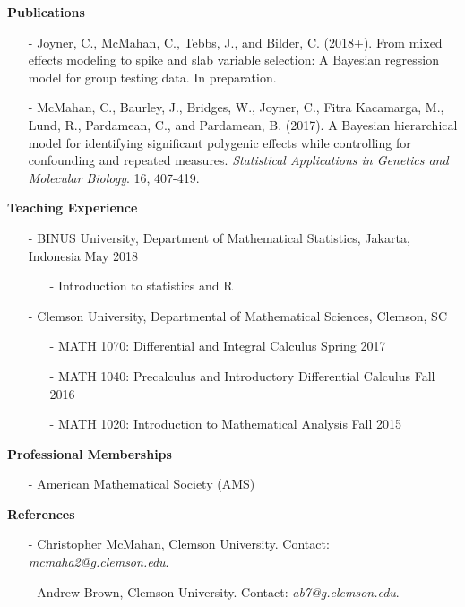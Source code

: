 \documentclass[10pt]{article}
\begin{document}
\newpage
\noindent
\textbf{Publications}
\begin{itemize}
\item[-] Joyner, C., McMahan, C., Tebbs, J., and Bilder, C. (2018+).  From mixed effects modeling to spike and slab variable selection: A Bayesian regression model for group testing data. In preparation.
\item[-] McMahan, C., Baurley, J., Bridges, W., Joyner, C., Fitra Kacamarga, M., Lund, R., Pardamean, C., and Pardamean, B. (2017). A Bayesian hierarchical model for identifying significant polygenic effects while controlling for confounding and repeated measures. \textit{Statistical Applications in Genetics and Molecular Biology}. 16, 407-419.
\end{itemize}

\noindent
\textbf{Teaching Experience}
\begin{itemize}
\item[-] BINUS University, Department of Mathematical Statistics, Jakarta, Indonesia \hfill May 2018
\begin{itemize}

\vspace{-0.25cm}

\item[-] Introduction to statistics and R
\end{itemize}
\item[-] Clemson University, Departmental of Mathematical Sciences, Clemson, SC
\begin{itemize}

\vspace{-0.25cm}

\item[-] MATH 1070: Differential and Integral Calculus \hfill Spring 2017

\vspace{-0.05cm}

\item[-] MATH 1040: Precalculus and Introductory Differential Calculus \hfill Fall 2016

\vspace{-0.05cm}

\item[-] MATH 1020: Introduction to Mathematical Analysis \hfill Fall 2015
\end{itemize}
\end{itemize}

\noindent
\textbf{Professional Memberships}
\begin{itemize}
\item[-] American Mathematical Society (AMS)
\end{itemize}

\noindent
\textbf{References}
\begin{itemize}
\item[-] Christopher McMahan, Clemson University. Contact: \emph{mcmaha2@g.clemson.edu}.
\item[-] Andrew Brown, Clemson University. Contact: \emph{ab7@g.clemson.edu}.
\end{itemize}
\end{document}
